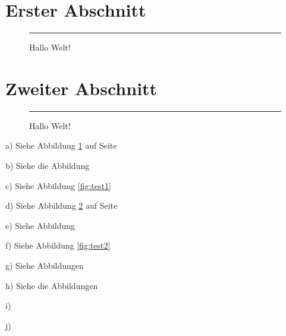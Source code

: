 \documentclass[ngerman]{scrartcl}
\begin{document}
 
\section{Erster Abschnitt}\label{sec:erst}
 
\blindtext[1]
 
\blindtext[1]
 
\blindtext[1]
 
\begin{figure}%
\rule{\columnwidth}{5cm}
\caption{Hallo Welt!}%
\label{fig:test1}%
\end{figure}
 
\blindtext[1]
 
\section{Zweiter Abschnitt}
 
\blindtext[1]
 
\blindtext[1]
 
\blindtext[1]
 
\blindtext[1]
 
\blindtext[1]
 
\begin{figure}%
\rule{\columnwidth}{5cm}
\caption{Hallo Welt!}%
\label{fig:test2}%
\end{figure}
 
\blindtext[1]
 
\blindtext[1]
 
\blindtext[1]
 
\blindtext[1]
 
a) Siehe Abbildung \ref{fig:test1} auf Seite \pageref{fig:test1}
 
b) Siehe die Abbildung 
 
c) Siehe Abbildung \vref{fig:test1}
 
d) Siehe Abbildung \ref{fig:test2} auf Seite \pageref{fig:test2}
 
e) Siehe Abbildung 
 
f) Siehe Abbildung \vref{fig:test2}
 
g) Siehe Abbildungen 
 
h) Siehe die Abbildungen 
 
i) 
 
j) 
 
\end{document}
